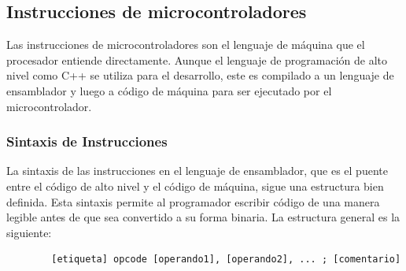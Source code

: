 \documentclass[a4paper,12pt]{article}
\begin{document}
	
	
	\subsection{Instrucciones de microcontroladores}
	Las instrucciones de microcontroladores son el lenguaje de máquina que el procesador entiende directamente. Aunque el lenguaje de programación de alto nivel como C++ se utiliza para el desarrollo, este es compilado a un lenguaje de ensamblador y luego a código de máquina para ser ejecutado por el microcontrolador.
	
	\subsubsection{Sintaxis de Instrucciones}
	La sintaxis de las instrucciones en el lenguaje de ensamblador, que es el puente entre el código de alto nivel y el código de máquina, sigue una estructura bien definida. Esta sintaxis permite al programador escribir código de una manera legible antes de que sea convertido a su forma binaria. La estructura general es la siguiente:
	
	\begin{verbatim}
		[etiqueta] opcode [operando1], [operando2], ... ; [comentario]
	\end{verbatim}
	
\end{document}

